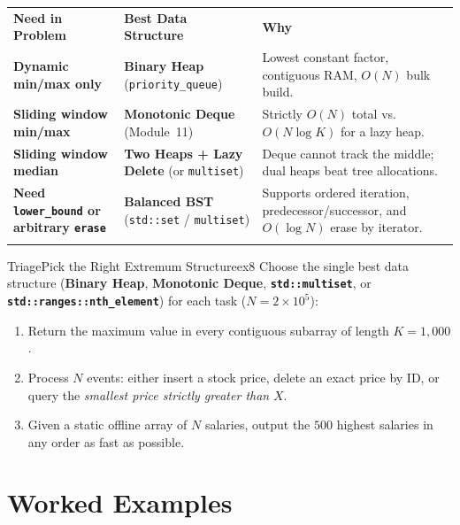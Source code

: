 \documentclass[11pt,a4paper]{article}
\theoremstyle{definition}
\begin{document}
\begingroup\small{}
\begin{tabularx}{\textwidth}{>{\raggedright\arraybackslash\bfseries}p{3.6cm} >{\raggedright\arraybackslash}p{4.3cm} >{\raggedright\arraybackslash}X}
\arrayrulecolor{primaryblue}\toprule[1.2pt]
\rowcolor{primaryblue!10}
\textcolor{primaryblue}{\textbf{Need in Problem}} & \textcolor{primaryblue}{\textbf{Best Data Structure}} & \textcolor{primaryblue}{\textbf{Why}} \\
\arrayrulecolor{codeframe}\midrule[0.6pt]
Dynamic min/max only & \textbf{Binary Heap} (\texttt{priority\_queue}) & Lowest constant factor, contiguous RAM, $O(N)$ bulk build. \\
Sliding window \textbf{min/max} & \textbf{Monotonic Deque} (Module~11) & Strictly $O(N)$ total vs.\ $O(N \log K)$ for a lazy heap. \\
Sliding window \textbf{median} & \textbf{Two Heaps + Lazy Delete} (or \texttt{multiset}) & Deque cannot track the middle; dual heaps beat tree allocations. \\
Need \texttt{lower\_bound} or arbitrary \texttt{erase} & \textbf{Balanced BST} (\texttt{std::set} / \texttt{multiset}) & Supports ordered iteration, predecessor/successor, and $O(\log N)$ erase by iterator. \\
\arrayrulecolor{primaryblue}\bottomrule[1.2pt]
\end{tabularx}\endgroup

\begin{tryitbox}{Triage}{Pick the Right Extremum Structure}{ex8}
Choose the single best data structure (\textbf{Binary Heap}, \textbf{Monotonic Deque}, \textbf{\texttt{std::multiset}}, or \textbf{\texttt{std::ranges::nth\_element}}) for each task ($N = 2 \times 10^5$):
\begin{enumerate}[itemsep=1pt, topsep=2pt]
    \item Return the maximum value in every contiguous subarray of length $K = 1{,}000$.
    \item Process $N$ events: either insert a stock price, delete an exact price by ID, or query the \emph{smallest price strictly greater than} $X$.
    \item Given a static offline array of $N$ salaries, output the $500$ highest salaries in any order as fast as possible.
\end{enumerate}
\end{tryitbox}

\section{Worked Examples}
\end{document}
